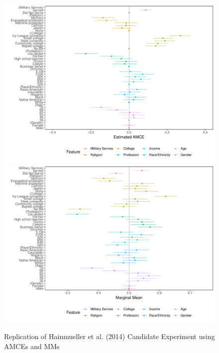\documentclass[a4paper,12pt]{article}\usepackage[]{graphicx}\usepackage[]{color}
\makeatletter
\def\maxwidth{ %
  \ifdim\Gin@nat@width>\linewidth
    \linewidth
  \else
    \Gin@nat@width
  \fi
}
\newenvironment{knitrout}{}{} %
\makeatother
\begin{document}
\begin{knitrout}
\color{fgcolor}\begin{figure}
\includegraphics[width=\maxwidth]{figure/hainmueller_candidate_replication-1} 
\includegraphics[width=\maxwidth]{figure/hainmueller_candidate_replication-2} \caption[Replication of Hainmueller et al]{Replication of Hainmueller et al. (2014) Candidate Experiment using AMCEs and MMs}\label{fig:hainmueller_candidate_replication}
\end{figure}


\end{knitrout}
\end{document}

